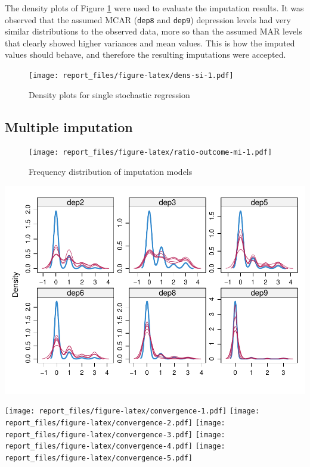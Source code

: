\documentclass[
]{article}
\begin{document}
The density plots of Figure \ref{fig:dens-si} were used to evaluate the imputation results. It was observed that the assumed MCAR (\texttt{dep8} and \texttt{dep9}) depression levels had very similar distributions to the observed data, more so than the assumed MAR levels that clearly showed higher variances and mean values. This is how the imputed values should behave, and therefore the resulting imputations were accepted.

\begin{figure}
\centering
\texttt{[image: report\_files/figure-latex/dens-si-1.pdf]}
\caption{\label{fig:dens-si}Density plots for single stochastic regression}
\end{figure}

\hypertarget{multiple-imputation}{%
\subsection{Multiple imputation}\label{multiple-imputation}}

\begin{figure}
\centering
\texttt{[image: report\_files/figure-latex/ratio-outcome-mi-1.pdf]}
\caption{\label{fig:ratio-outcome-mi}Frequency distribution of imputation models}
\end{figure}

\includegraphics{report_files/figure-latex/dens-multiple-1.pdf}

\texttt{[image: report\_files/figure-latex/convergence-1.pdf]} \texttt{[image: report\_files/figure-latex/convergence-2.pdf]} \texttt{[image: report\_files/figure-latex/convergence-3.pdf]} \texttt{[image: report\_files/figure-latex/convergence-4.pdf]} \texttt{[image: report\_files/figure-latex/convergence-5.pdf]}
\end{document}
